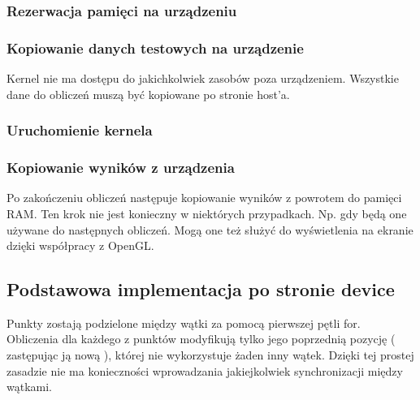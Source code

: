 \subsubsection{ Rezerwacja pamięci na urządzeniu }


\subsubsection{ Kopiowanie danych testowych na urządzenie }
Kernel nie ma dostępu do jakichkolwiek zasobów poza urządzeniem. Wszystkie dane do obliczeń muszą być kopiowane po stronie host'a.

\subsubsection{ Uruchomienie kernela }


\subsubsection{ Kopiowanie wyników z urządzenia }
Po zakończeniu obliczeń następuje kopiowanie wyników z powrotem do pamięci RAM. Ten krok nie jest konieczny w niektórych przypadkach. Np. gdy będą one używane do następnych obliczeń. Mogą one też służyć do wyświetlenia na ekranie dzięki współpracy z OpenGL. 


\subsection{ Podstawowa implementacja po stronie device }

Punkty zostają podzielone między wątki za pomocą pierwszej pętli for. Obliczenia dla każdego z punktów modyfikują tylko jego poprzednią pozycję ( zastępując ją nową ), której nie wykorzystuje żaden inny wątek. Dzięki tej prostej zasadzie nie ma konieczności wprowadzania jakiejkolwiek synchronizacji między wątkami.


